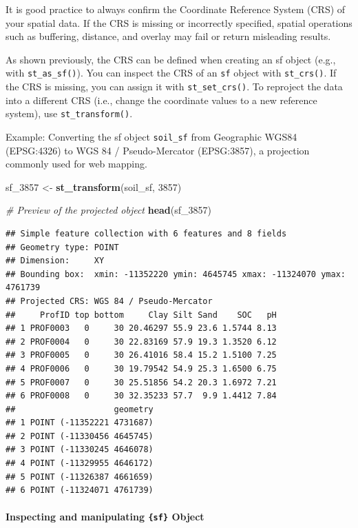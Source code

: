 \documentclass[
  10pt,
  b5paper,
  oneside]{book}
\newenvironment{Shaded}{\begin{snugshade}}{\end{snugshade}}
\newcommand{\CommentTok}[1]{\textcolor[rgb]{0.56,0.35,0.01}{\textit{#1}}}
\newcommand{\DecValTok}[1]{\textcolor[rgb]{0.00,0.00,0.81}{#1}}
\newcommand{\FunctionTok}[1]{\textcolor[rgb]{0.13,0.29,0.53}{\textbf{#1}}}
\newcommand{\NormalTok}[1]{#1}
\newcommand{\OtherTok}[1]{\textcolor[rgb]{0.56,0.35,0.01}{#1}}
\begin{document}
It is good practice to always confirm the Coordinate Reference System (CRS) of your spatial data. If the CRS is missing or incorrectly specified, spatial operations such as buffering, distance, and overlay may fail or return misleading results.

As shown previously, the CRS can be defined when creating an sf object (e.g., with \texttt{st\_as\_sf()}). You can inspect the CRS of an \texttt{sf} object with \texttt{st\_crs()}. If the CRS is missing, you can assign it with \texttt{st\_set\_crs()}. To reproject the data into a different CRS (i.e., change the coordinate values to a new reference system), use \texttt{st\_transform()}.

Example: Converting the sf object \texttt{soil\_sf} from Geographic WGS84 (EPSG:4326) to WGS 84 / Pseudo-Mercator (EPSG:3857), a projection commonly used for web mapping.

\begin{Shaded}
\begin{Highlighting}[]
\NormalTok{sf\_3857 }\OtherTok{\textless{}{-}} \FunctionTok{st\_transform}\NormalTok{(soil\_sf, }\DecValTok{3857}\NormalTok{)}

\CommentTok{\# Preview of the projected object}
\FunctionTok{head}\NormalTok{(sf\_3857)}
\end{Highlighting}
\end{Shaded}

\begin{verbatim}
## Simple feature collection with 6 features and 8 fields
## Geometry type: POINT
## Dimension:     XY
## Bounding box:  xmin: -11352220 ymin: 4645745 xmax: -11324070 ymax: 4761739
## Projected CRS: WGS 84 / Pseudo-Mercator
##     ProfID top bottom     Clay Silt Sand    SOC   pH
## 1 PROF0003   0     30 20.46297 55.9 23.6 1.5744 8.13
## 2 PROF0004   0     30 22.83169 57.9 19.3 1.3520 6.12
## 3 PROF0005   0     30 26.41016 58.4 15.2 1.5100 7.25
## 4 PROF0006   0     30 19.79542 54.9 25.3 1.6500 6.75
## 5 PROF0007   0     30 25.51856 54.2 20.3 1.6972 7.21
## 6 PROF0008   0     30 32.35233 57.7  9.9 1.4412 7.84
##                    geometry
## 1 POINT (-11352221 4731687)
## 2 POINT (-11330456 4645745)
## 3 POINT (-11330245 4646078)
## 4 POINT (-11329955 4646172)
## 5 POINT (-11326387 4661659)
## 6 POINT (-11324071 4761739)
\end{verbatim}

\paragraph*{\texorpdfstring{Inspecting and manipulating \texttt{\{sf\}} Object}{Inspecting and manipulating \{sf\} Object}}\label{inspecting-and-manipulating-sf-object}
\end{document}
